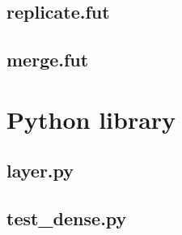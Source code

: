 \subsection{replicate.fut}


\subsection{merge.fut}


\section{Python library} \label{app:implementation_volrpynn}
\subsection{layer.py}


\subsection{test\_dense.py}


